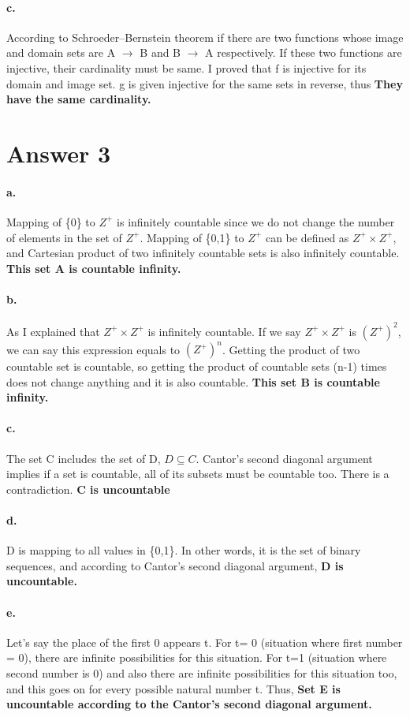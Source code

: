 \documentclass[11pt]{article}
\begin{document}
\paragraph{c.}
According to Schroeder–Bernstein theorem if there are two functions whose image and domain sets are A $\rightarrow$ B and B $\rightarrow$ A respectively. If these two functions are injective, their cardinality must be same. I proved that f is injective for its domain and image set. g is given injective for the same sets in reverse, thus \textbf{They have the same cardinality.}
\section*{Answer 3}
\paragraph{a.}
Mapping of \{0\} to $Z^+$ is infinitely countable since we do not change the number of elements in the set of $Z^+$. Mapping of \{0,1\} to $Z^+$ can be defined as $Z^+ \times Z^+$, and Cartesian product of two infinitely countable sets is also infinitely countable. \textbf{This set A is countable infinity.} 
\paragraph{b.}
As I explained that $Z^+ \times Z^+$ is infinitely countable. If we say $Z^+ \times Z^+$ is $(Z^+)^2$, we can say this expression equals to $(Z^+)^n$. Getting the product of two countable set is countable, so getting the product of countable sets (n-1) times does not change anything and it is also countable. \textbf{This set B is countable infinity.}
\paragraph{c.}
The set C includes the set of D, $D\subseteq C$. Cantor's second diagonal argument implies if a set is countable, all of its subsets must be countable too. There is a contradiction. \textbf{C is uncountable}
\paragraph{d.}
D is mapping to all values in \{0,1\}. In other words, it is the set of binary sequences, and according to Cantor's second diagonal argument, \textbf{D is uncountable.}

\paragraph{e.}
Let's say the place of the first 0 appears t. For t= 0 (situation where first number = 0), there are infinite possibilities for this situation. For t=1 (situation where second number is 0) and also there are infinite possibilities for this situation too, and this goes on for every possible natural number t. Thus, \textbf{Set E is uncountable according to the Cantor's second diagonal argument.}
\end{document}
